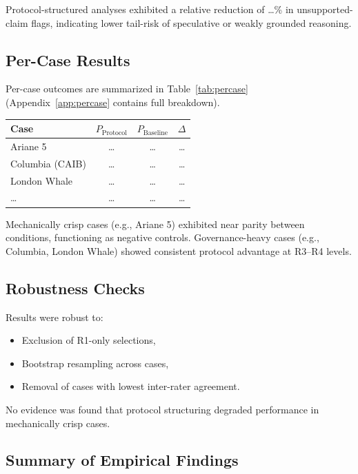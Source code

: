Protocol-structured analyses exhibited a relative reduction of \ldots\% in unsupported-claim flags, indicating lower tail-risk of speculative or weakly grounded reasoning.

\subsection{Per-Case Results}

Per-case outcomes are summarized in Table~\ref{tab:percase} (Appendix~\ref{app:percase} contains full breakdown).

\begin{center}
\begin{tabular}{lccc}
\toprule
Case & $P_{\text{Protocol}}$ & $P_{\text{Baseline}}$ & $\Delta$ \\
\midrule
Ariane 5 & \ldots & \ldots & \ldots \\
Columbia (CAIB) & \ldots & \ldots & \ldots \\
London Whale & \ldots & \ldots & \ldots \\
\ldots & \ldots & \ldots & \ldots \\
\bottomrule
\end{tabular}
\end{center}

Mechanically crisp cases (e.g., Ariane 5) exhibited near parity between conditions, functioning as negative controls. Governance-heavy cases (e.g., Columbia, London Whale) showed consistent protocol advantage at R3--R4 levels.

\subsection{Robustness Checks}

Results were robust to:
\begin{itemize}
    \item Exclusion of R1-only selections,
    \item Bootstrap resampling across cases,
    \item Removal of cases with lowest inter-rater agreement.
\end{itemize}

No evidence was found that protocol structuring degraded performance in mechanically crisp cases.

\subsection{Summary of Empirical Findings}

